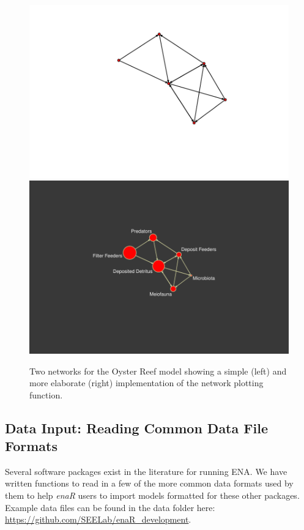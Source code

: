 \documentclass[article]{jss}
\begin{document}
\begin{figure}
\includegraphics{enaR-vignette-014}
\includegraphics{enaR-vignette-015}
\caption{Two networks for the Oyster Reef model
  \citep{dame81} showing a simple (left) and more elaborate (right)
  implementation of the network plotting function.} \label{fig:oyster}
\end{figure}





\subsection{Data Input: Reading Common Data File Formats} Several
software packages exist in the literature for running ENA. We have
written functions to read in a few of the more common data formats
used by them to help \textit{enaR} users to import models formatted
for these other packages. Example data files can be found in the data
folder here: \url{https://github.com/SEELab/enaR_development}.
\end{document}
